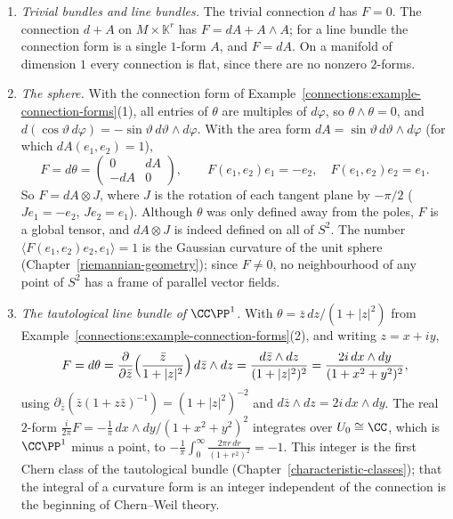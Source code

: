 \begin{example}\label{connections:example-curvature-computations}
\begin{enumerate}
\item \emph{Trivial bundles and line bundles.} The trivial connection $d$ has $F = 0$. The connection $d + A$ on $M \times \mathbb{K}^r$ has $F = dA + A \wedge A$; for a line bundle
the connection form is a single $1$-form $A$, and $F = dA$. On a manifold of dimension $1$ every connection is flat, since there are no nonzero $2$-forms.
\item \emph{The sphere.} With the connection form of Example~\ref{connections:example-connection-forms}(1), all entries of $\theta$ are multiples of $d\varphi$, so $\theta \wedge \theta = 0$, and
$d(\cos\vartheta\,d\varphi) = -\sin\vartheta\,d\vartheta \wedge d\varphi$. With the area form $dA = \sin\vartheta\,d\vartheta \wedge d\varphi$ (for which $dA(e_1, e_2) = 1$),
\[
F = d\theta = \begin{pmatrix} 0 & dA\\ -dA & 0\end{pmatrix}, \qquad F(e_1, e_2)e_1 = -e_2, \quad F(e_1, e_2)e_2 = e_1 .
\]
So $F = dA \otimes J$, where $J$ is the rotation of each tangent plane by $-\pi/2$ ($Je_1 = -e_2$, $Je_2 = e_1$). Although $\theta$ was only defined away from the poles, $F$ is
a global tensor, and $dA \otimes J$ is indeed defined on all of $S^2$. The number $\langle F(e_1, e_2)e_2, e_1\rangle = 1$ is the Gaussian curvature of the unit sphere
(Chapter~\ref{riemannian-geometry}); since $F \neq 0$, no neighbourhood of any point of $S^2$ has a frame of parallel vector fields.
\item \emph{The tautological line bundle of $\CC\PP^1$.} With $\theta = \bar z\,dz/(1 + |z|^2)$ from Example~\ref{connections:example-connection-forms}(2), and writing $z = x + iy$,
\[
F = d\theta = \frac{\partial}{\partial\bar z}\Bigl(\frac{\bar z}{1 + |z|^2}\Bigr)\,d\bar z \wedge dz = \frac{d\bar z \wedge dz}{(1 + |z|^2)^2} = \frac{2i\,dx \wedge dy}{(1 + x^2 + y^2)^2},
\]
using $\partial_{\bar z}(\bar z(1 + z\bar z)^{-1}) = (1 + |z|^2)^{-2}$ and $d\bar z \wedge dz = 2i\,dx \wedge dy$. The real $2$-form $\frac{i}{2\pi}F = -\frac1\pi\,dx \wedge dy/(1 + x^2 + y^2)^2$
integrates over $U_0 \cong \CC$, which is $\CC\PP^1$ minus a point, to $-\frac1\pi\int_0^\infty\frac{2\pi r\,dr}{(1 + r^2)^2} = -1$. This integer is the first Chern class of the
tautological bundle (Chapter~\ref{characteristic-classes}); that the integral of a curvature form is an integer independent of the connection is the beginning of Chern--Weil
theory.
\end{enumerate}
\end{example}

